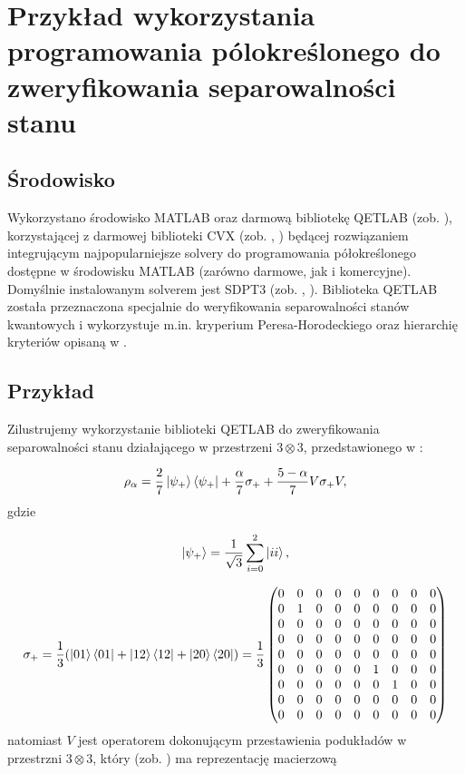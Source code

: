 \section{Przykład wykorzystania programowania pólokreślonego do zweryfikowania separowalności stanu}

\subsection{Środowisko}

Wykorzystano środowisko MATLAB oraz darmową bibliotekę QETLAB (zob. \cite{qetlab}), korzystającej z darmowej biblioteki CVX (zob. \cite{cvx}, \cite{gb08}) będącej rozwiązaniem integrującym najpopularniejsze solvery do programowania półokreślonego dostępne w środowisku MATLAB (zarówno darmowe, jak i komercyjne). Domyślnie instalowanym solverem jest SDPT3 (zob. \cite{sdpt3a}, \cite{sdpt3b}). Biblioteka QETLAB została przeznaczona specjalnie do weryfikowania separowalności stanów kwantowych i wykorzystuje m.in. kryperium Peresa-Horodeckiego oraz hierarchię kryteriów opisaną w \cite{3}.

\subsection{Przykład}

Zilustrujemy wykorzystanie biblioteki QETLAB do zweryfikowania separowalności stanu działającego w przestrzeni $3 \otimes 3$, przedstawionego w \cite{3}:

$$
    \rho_{\alpha} = \frac{2}{7} \ket{\psi_{+}} \bra{\psi_{+}} + \frac{\alpha}{7} \sigma_{+} + \frac{5 - \alpha}{7} V \sigma_{+} V,
$$
gdzie

$$
    \ket{\psi_{+}} = \frac{1}{\sqrt{3}} \sum\limits_{i = 0}^{2} \ket{ii},
$$

$$
    \sigma_{+} = \frac{1}{3} (\ket{01} \bra{01} + \ket{12} \bra{12} + \ket{20} \bra{20}) = \frac{1}{3}
    \begin{pmatrix}
        0 & 0 & 0 & 0 & 0 & 0 & 0 & 0 & 0 \\
        0 & 1 & 0 & 0 & 0 & 0 & 0 & 0 & 0 \\
        0 & 0 & 0 & 0 & 0 & 0 & 0 & 0 & 0 \\
        0 & 0 & 0 & 0 & 0 & 0 & 0 & 0 & 0 \\
        0 & 0 & 0 & 0 & 0 & 0 & 0 & 0 & 0 \\
        0 & 0 & 0 & 0 & 0 & 1 & 0 & 0 & 0 \\
        0 & 0 & 0 & 0 & 0 & 0 & 1 & 0 & 0 \\
        0 & 0 & 0 & 0 & 0 & 0 & 0 & 0 & 0 \\
        0 & 0 & 0 & 0 & 0 & 0 & 0 & 0 & 0
    \end{pmatrix}
$$
natomiast $V$ jest operatorem dokonującym przestawienia podukładów w przestrzni $3 \otimes 3$, który (zob. \cite{tri}) ma reprezentację macierzową

